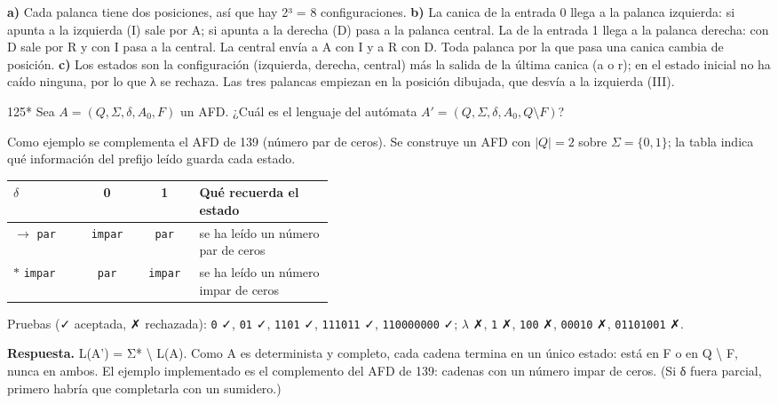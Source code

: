 \documentclass[11pt]{article}
\begin{document}
\textbf{a)} Cada palanca tiene dos posiciones, así que hay 2³ = 8 configuraciones. \textbf{b)} La canica de la entrada 0 llega a la palanca izquierda: si apunta a la izquierda (I) sale por A; si apunta a la derecha (D) pasa a la palanca central. La de la entrada 1 llega a la palanca derecha: con D sale por R y con I pasa a la central. La central envía a A con I y a R con D. Toda palanca por la que pasa una canica cambia de posición. \textbf{c)} Los estados son la configuración (izquierda, derecha, central) más la salida de la última canica (a o r); en el estado inicial no ha caído ninguna, por lo que λ se rechaza. Las tres palancas empiezan en la posición dibujada, que desvía a la izquierda (III).



\begin{ejercicio}{125}{*}
Sea $A = (Q, \Sigma, \delta, A_0, F)$ un AFD. ¿Cuál es el lenguaje del autómata $A' = (Q, \Sigma, \delta, A_0, Q \setminus F)$?
\end{ejercicio}
\proc Como ejemplo se complementa el AFD de 139 (número par de ceros). Se construye un AFD con $|Q| = 2$ sobre $\Sigma = \{0, 1\}$; la tabla indica qué información del prefijo leído guarda cada estado.
\begin{center}\small\begin{tabular}{lccp{0.42\linewidth}}\toprule
$\delta$ & 0 & 1 & Qué recuerda el estado \\\midrule
$\to$ \texttt{par} & \texttt{impar} & \texttt{par} & se ha leído un número par de ceros \\
$*$ \texttt{impar} & \texttt{par} & \texttt{impar} & se ha leído un número impar de ceros \\
\bottomrule\end{tabular}\end{center}
Pruebas (✓ aceptada, ✗ rechazada): \texttt{0} ✓, \texttt{01} ✓, \texttt{1101} ✓, \texttt{111011} ✓, \texttt{110000000} ✓; $\lambda$ ✗, \texttt{1} ✗, \texttt{100} ✗, \texttt{00010} ✗, \texttt{01101001} ✗.


\textbf{Respuesta.} L(A') = Σ* \textbackslash{} L(A). Como A es determinista y completo, cada cadena termina en un único estado: está en F o en Q \textbackslash{} F, nunca en ambos. El ejemplo implementado es el complemento del AFD de 139: cadenas con un número impar de ceros. (Si δ fuera parcial, primero habría que completarla con un sumidero.)
\end{document}
